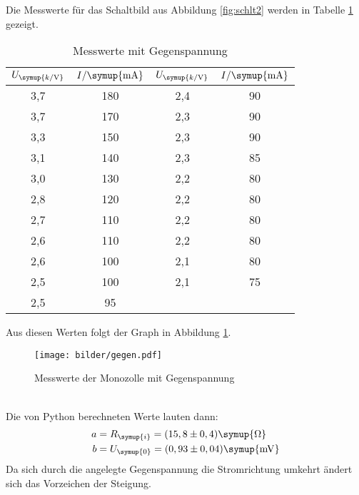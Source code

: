 \newpage
Die Messwerte für das Schaltbild aus Abbildung \ref{fig:schlt2} werden in
Tabelle \ref{tab:ggn} gezeigt.
\begin{table}[H]
  \centering
  \begin{tabular}{c c c c}
    \toprule
    $U_\symup{k/\si{\volt}}$ & $I/\symup{\si{\milli\ampere}}$  &
    $U_\symup{k/\si{\volt}}$ & $I/\symup{\si{\milli\ampere}}$  \\
    \midrule
    3,7  &  180  &  2,4  &  90  \\
    3,7  &  170  &  2,3  &  90  \\
    3,3  &  150  &  2,3  &  90  \\
    3,1  &  140  &  2,3  &  85  \\
    3,0  &  130  &  2,2  &  80  \\
    2,8  &  120  &  2,2  &  80  \\
    2,7  &  110  &  2,2  &  80  \\
    2,6  &  110  &  2,2  &  80  \\
    2,6  &  100  &  2,1  &  80  \\
    2,5  &  100  &  2,1  &  75  \\
    2,5  &   95  &  \hrulefill  &  \hrulefill \\
    \bottomrule
  \end{tabular}
  \caption{Messwerte mit Gegenspannung}
  \label{tab:ggn}
\end{table}
Aus diesen Werten folgt der Graph in Abbildung \ref{fig:ggn}.
\begin{figure}
  \centering
  \texttt{[image: bilder/gegen.pdf]}
  \caption{Messwerte der Monozolle mit Gegenspannung}
  \label{fig:ggn}
\end{figure}
\\
Die von Python berechneten Werte lauten dann:
\begin{align*}
   a &= R_\symup{i} = (15,8 \pm 0,4) \symup{\si{\ohm}} \\ %
   b &= U_\symup{0} = (0,93 \pm 0,04) \symup{\si{\milli\volt}}
\end{align*}
Da sich durch die angelegte Gegenspannung die Stromrichtung umkehrt ändert sich
das Vorzeichen der Steigung.
